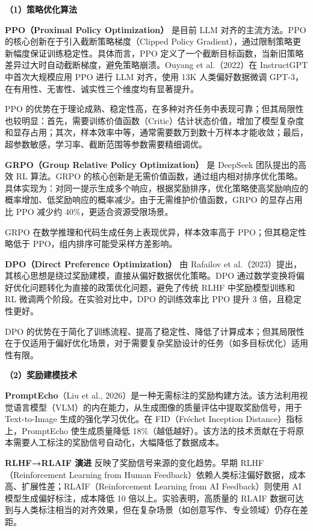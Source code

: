 \documentclass[12pt,a4paper]{article}
\begin{document}
\textbf{（1）策略优化算法}

\textbf{PPO（Proximal Policy Optimization）} 是目前 LLM 对齐的主流方法。PPO 的核心创新在于引入截断策略梯度（Clipped Policy Gradient），通过限制策略更新幅度保证训练稳定性。具体而言，PPO 定义了一个截断目标函数，当新旧策略差异过大时自动截断梯度，避免策略崩溃。Ouyang et al.（2022）在 InstructGPT 中首次大规模应用 PPO 进行 LLM 对齐，使用 13K 人类偏好数据微调 GPT-3，在有用性、无害性、诚实性三个维度均有显著提升。

PPO 的优势在于理论成熟、稳定性高，在多种对齐任务中表现可靠；但其局限性也较明显：首先，需要训练价值函数（Critic）估计状态价值，增加了模型复杂度和显存占用；其次，样本效率中等，通常需要数万到数十万样本才能收敛；最后，超参数敏感，学习率、截断范围等参数需要精细调优。

\textbf{GRPO（Group Relative Policy Optimization）} 是 DeepSeek 团队提出的高效 RL 算法。GRPO 的核心创新是无需价值函数，通过组内相对排序优化策略。具体实现为：对同一提示生成多个响应，根据奖励排序，优化策略使高奖励响应的概率增加、低奖励响应的概率减少。由于无需维护价值函数，GRPO 的显存占用比 PPO 减少约 40\%，更适合资源受限场景。

GRPO 在数学推理和代码生成任务上表现优异，样本效率高于 PPO；但其稳定性略低于 PPO，组内排序可能受采样方差影响。

\textbf{DPO（Direct Preference Optimization）} 由 Rafailov et al.（2023）提出，其核心思想是绕过奖励建模，直接从偏好数据优化策略。DPO 通过数学变换将偏好优化问题转化为直接的政策优化问题，避免了传统 RLHF 中奖励模型训练和 RL 微调两个阶段。在实验对比中，DPO 的训练效率比 PPO 提升 3 倍，且稳定性更好。

DPO 的优势在于简化了训练流程、提高了稳定性、降低了计算成本；但其局限性在于仅适用于偏好优化场景，对于需要复杂奖励设计的任务（如多目标优化）适用性有限。

\textbf{（2）奖励建模技术}

\textbf{PromptEcho}（Liu et al., 2026）是一种无需标注的奖励构建方法。该方法利用视觉语言模型（VLM）的内在能力，从生成图像的质量评估中提取奖励信号，用于 Text-to-Image 生成的强化学习优化。在 FID（Fréchet Inception Distance）指标上，PromptEcho 使生成质量降低 18\%（越低越好）。该方法的技术贡献在于将原本需要人工标注的奖励信号自动化，大幅降低了数据成本。

\textbf{RLHF→RLAIF 演进} 反映了奖励信号来源的变化趋势。早期 RLHF（Reinforcement Learning from Human Feedback）依赖人类标注偏好数据，成本高、扩展性差；RLAIF（Reinforcement Learning from AI Feedback）则使用 AI 模型生成偏好标注，成本降低 10 倍以上。实验表明，高质量的 RLAIF 数据可达到与人类标注相当的对齐效果，但在复杂场景（如创意写作、专业领域）仍存在差距。
\end{document}
